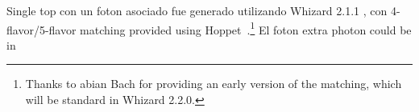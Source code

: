 Single top con un foton asociado fue generado utilizando
Whizard 2.1.1 \cite{whizard, whizard2}, con 4-flavor/5-flavor
matching provided using Hoppet~\cite{hoppet}.\footnote{Thanks to
  abian Bach for providing an early version of the matching, which
  will be standard in Whizard 2.2.0.}
El foton extra photon could be in


